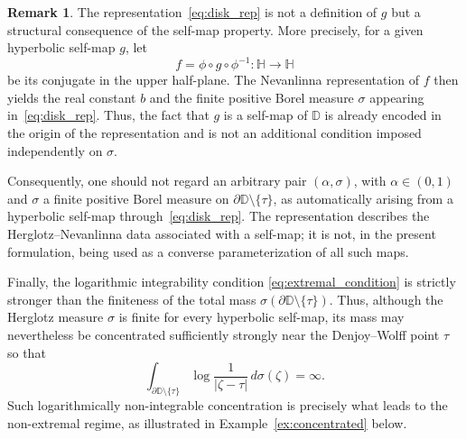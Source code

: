 \documentclass[12pt]{amsart}
\numberwithin{equation}{section}
\theoremstyle{plain}
\theoremstyle{definition}
\newtheorem{remark}[equation]{Remark}
\begin{document}
\begin{remark}
\label{rem:self_map_constraint}
The representation~\eqref{eq:disk_rep} is not a definition of $g$ but a
structural consequence of the self-map property. More precisely, for a
given hyperbolic self-map $g$, let
\[
f=\phi\circ g\circ\phi^{-1}:\mathbb H\to\mathbb H
\]
be its conjugate in the upper half-plane. The Nevanlinna representation
of $f$ then yields the real constant $b$ and the finite positive Borel
measure $\sigma$ appearing in~\eqref{eq:disk_rep}. Thus, the fact that
$g$ is a self-map of $\mathbb D$ is already encoded in the origin of the
representation and is not an additional condition imposed independently
on $\sigma$.

Consequently, one should not regard an arbitrary pair
$(\alpha,\sigma)$, with $\alpha\in(0,1)$ and $\sigma$ a finite positive
Borel measure on
$\partial\mathbb D\setminus\{\tau\}$, as automatically arising from a
hyperbolic self-map through~\eqref{eq:disk_rep}. The representation
describes the Herglotz--Nevanlinna data associated with a self-map; it is
not, in the present formulation, being used as a converse
parameterization of all such maps.

Finally, the logarithmic integrability condition
\eqref{eq:extremal_condition} is strictly stronger than the finiteness
of the total mass
$\sigma(\partial\mathbb D\setminus\{\tau\})$. Thus, although the
Herglotz measure $\sigma$ is finite for every hyperbolic self-map, its
mass may nevertheless be concentrated sufficiently strongly near the
Denjoy--Wolff point $\tau$ so that
\[
\int_{\partial\mathbb D\setminus\{\tau\}}
\log\frac{1}{|\zeta-\tau|}
\,d\sigma(\zeta)
=\infty.
\]
Such logarithmically non-integrable concentration is precisely what
leads to the non-extremal regime, as illustrated in
Example~\ref{ex:concentrated} below.
\end{remark}
\end{document}
